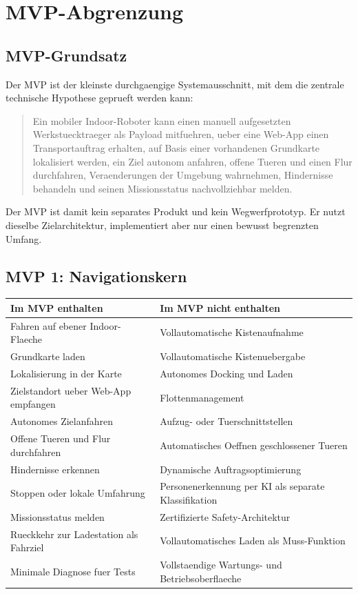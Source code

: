 \chapter{MVP-Abgrenzung}

\section{MVP-Grundsatz}

Der MVP ist der kleinste durchgaengige Systemausschnitt, mit dem die zentrale technische Hypothese geprueft werden kann:
\begin{quote}
Ein mobiler Indoor-Roboter kann einen manuell aufgesetzten Werkstuecktraeger als Payload mitfuehren, ueber eine Web-App einen Transportauftrag erhalten, auf Basis einer vorhandenen Grundkarte lokalisiert werden, ein Ziel autonom anfahren, offene Tueren und einen Flur durchfahren, Veraenderungen der Umgebung wahrnehmen, Hindernisse behandeln und seinen Missionsstatus nachvollziehbar melden.
\end{quote}

Der MVP ist damit kein separates Produkt und kein Wegwerfprototyp. Er nutzt dieselbe Zielarchitektur, implementiert aber nur einen bewusst begrenzten Umfang.

\section{MVP 1: Navigationskern}

\begin{longtable}{L{0.42\textwidth} L{0.42\textwidth}}
\toprule
Im MVP enthalten & Im MVP nicht enthalten \\
\midrule
Fahren auf ebener Indoor-Flaeche & Vollautomatische Kistenaufnahme \\
Grundkarte laden & Vollautomatische Kistenuebergabe \\
Lokalisierung in der Karte & Autonomes Docking und Laden \\
Zielstandort ueber Web-App empfangen & Flottenmanagement \\
Autonomes Zielanfahren & Aufzug- oder Tuerschnittstellen \\
Offene Tueren und Flur durchfahren & Automatisches Oeffnen geschlossener Tueren \\
Hindernisse erkennen & Dynamische Auftragsoptimierung \\
Stoppen oder lokale Umfahrung & Personenerkennung per KI als separate Klassifikation \\
Missionsstatus melden & Zertifizierte Safety-Architektur \\
Rueckkehr zur Ladestation als Fahrziel & Vollautomatisches Laden als Muss-Funktion \\
Minimale Diagnose fuer Tests & Vollstaendige Wartungs- und Betriebsoberflaeche \\
\bottomrule
\end{longtable}

